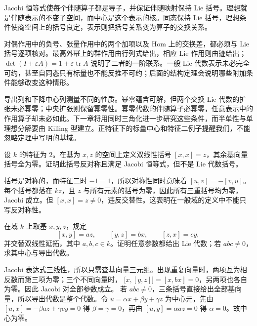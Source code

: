 \begin{chaptersummary}
	Jacobi 恒等式使每个伴随算子都是导子，并保证伴随映射保持 Lie 括号。理想就是伴随表示的不变子空间，而中心是这个表示的核。同态保持 Lie 括号，理想条件使商空间上的括号良定，表示则把括号关系变为算子的交换关系。

	\ProseParagraphBreak

	对偶作用中的负号、张量作用中的两个加项以及 Hom 上的交换差，都必须与 Lie 括号逐项核对。最高外幂上的群作用由行列式给出，相应 Lie 作用则由迹给出；\(\det(I+\varepsilon A)=1+\varepsilon\operatorname{tr}A\) 说明了二者的一阶联系。一般 Lie 代数表示未必完全可约，甚至自同态只有标量也不能反推不可约；后面的结构定理会说明哪些附加条件能够改变这种情形。

	\ProseParagraphBreak

	导出列和下降中心列测量不同的性质。幂零蕴含可解，但两个交换 Lie 代数的扩张未必幂零；中央扩张则保留幂零性。幂零代数的伴随算子必幂零，任意表示中的作用算子却未必如此。下一章将用同时三角化进一步研究这些条件，而半单性与单理想分解要由 Killing 型建立。正特征下的标量中心和特征二例子提醒我们，不能忽略定理中写明的基域。
\end{chaptersummary}

\BookExercises

\begin{exercise}\label{b5:ex:11-characteristic-two-alternating}
	设 \(k\) 的特征为 \(2\)。在基为 \(x,z\) 的空间上定义双线性括号 \([x,x]=z\)，其余基向量括号全为零。证明此括号反对称且满足 Jacobi 恒等式，但不是 Lie 代数括号。
\end{exercise}
\begin{solution}
	括号是对称的，而特征二时 \(-1=1\)，所以对称性同时意味着 \([u,v]=-[v,u]\)。每个括号都落在 \(kz\)，且 \(z\) 与所有元素的括号为零，因此所有三重括号均为零，Jacobi 成立。但 \([x,x]=z\ne0\)，违反交替性。这表明在一般域的定义中不能只写反对称性。
\end{solution}

\begin{exercise}\label{b5:ex:11-three-parameter-brackets}
	在域 \(k\) 上取基 \(x,y,z\)，规定
	\[
		[x,y]=az,\qquad[y,z]=bx,\qquad[z,x]=cy,
	\]
	并交替双线性延拓，其中 \(a,b,c\in k\)。证明任意参数都给出 Lie 代数；若 \(abc\ne0\)，求其中心与导出代数。
\end{exercise}
\begin{solution}
	Jacobi 表达式三线性，所以只需查基向量三元组。出现重复向量时，两项互为相反数而第三项为零；三个不同向量时， \(\bigl[x,[y,z]\bigr]=[x,bx]=0\)，另两项也各自为零。因此 Jacobi 对全部参数成立。 若 \(abc\ne0\)，三条括号直接给出全部基向量，所以导出代数是整个代数。令 \(u=\alpha x+\beta y+\gamma z\) 为中心元，先由 \([u,x]=-\beta az+\gamma cy=0\) 得 \(\beta=\gamma=0\)，再由 \([u,y]=\alpha az=0\) 得 \(\alpha=0\)。故中心为零。
\end{solution}

